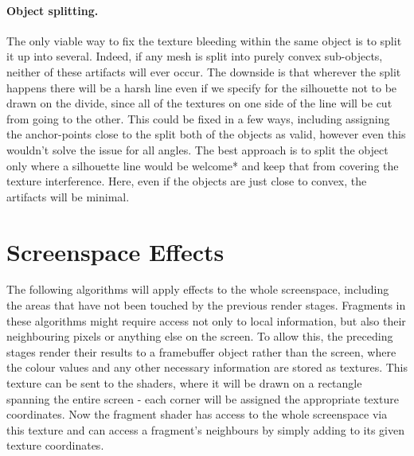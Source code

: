 \documentclass[a4paper, 12pt]{article}
\begin{document}
\paragraph{Object splitting.}
The only viable way to fix the texture bleeding within the same object is to split it up into several. Indeed, if any mesh is split into purely convex sub-objects, neither of these artifacts will ever occur. The downside is that wherever the split happens there will be a harsh line even if we specify for the silhouette not to be drawn on the divide, since all of the textures on one side of the line will be cut from going to the other. This could be fixed in a few ways, including assigning the anchor-points close to the split both of the objects as valid, however even this wouldn't solve the issue for all angles. The best approach is to split the object only where a silhouette line would be welcome* and keep that from covering the texture interference. Here, even if the objects are just close to convex, the artifacts will be minimal.



\section{Screenspace Effects}
The following algorithms will apply effects to the whole screenspace, including the areas that have not been touched by the previous render stages. Fragments in these algorithms might require access not only to local information, but also their neighbouring pixels or anything else on the screen. To allow this, the preceding stages render their results to a framebuffer object rather than the screen, where the colour values and any other necessary information are stored as textures. This texture can be sent to the shaders, where it will be drawn on a rectangle spanning the entire screen - each corner will be assigned the appropriate texture coordinates. Now the fragment shader has access to the whole screenspace via this texture and can access a fragment's neighbours by simply adding to its given texture coordinates.
\end{document}
